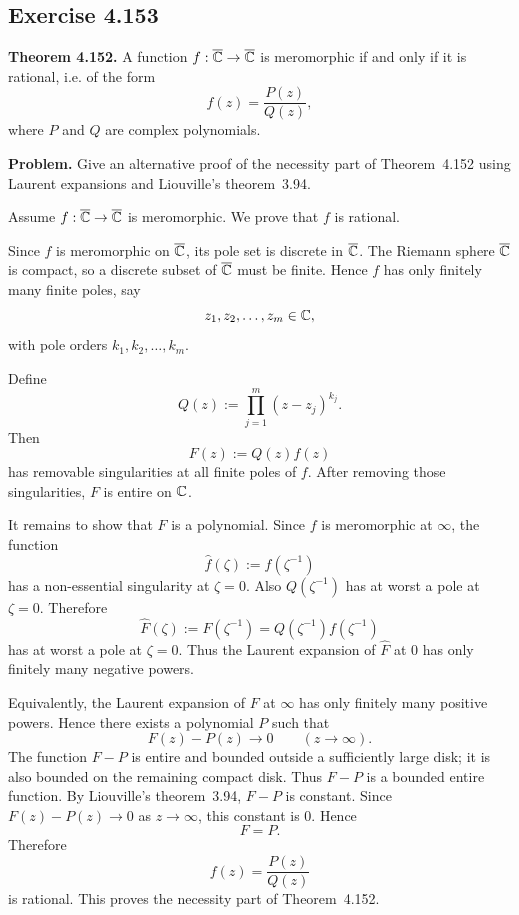 \documentclass{article}
\providecommand{\Chat}{\overline{\C}}
\begin{document}
\subsection{Exercise 4.153}
\label{sec:ca-ex-4-153-old}

\textbf{Theorem 4.152.}
A function $f:\Chat\to\Chat$ is meromorphic if and only if it is rational,
i.e. of the form
\[
  f(z)=\frac{P(z)}{Q(z)},
\]
where $P$ and $Q$ are complex polynomials.

\textbf{Problem.}
Give an alternative proof of the necessity part of Theorem~4.152 using
Laurent expansions and Liouville's theorem~3.94.

\begin{solution}
  Assume $f:\Chat\to\Chat$ is meromorphic. We prove that $f$ is rational.

  Since $f$ is meromorphic on $\Chat$, its pole set is discrete in $\Chat$.
  The Riemann sphere $\Chat$ is compact, so a discrete subset of $\Chat$ must be
  finite. Hence $f$ has only finitely many finite poles, say
  \[
    z_1,z_2,\dots,z_m\in\mathbb{C},
  \]
  with pole orders $k_1,k_2,\dots,k_m$.

  Define
  \[
    Q(z):=\prod_{j=1}^m (z-z_j)^{k_j}.
  \]
  Then
  \[
    F(z):=Q(z)f(z)
  \]
  has removable singularities at all finite poles of $f$. After removing those
  singularities, $F$ is entire on $\mathbb{C}$.

  It remains to show that $F$ is a polynomial. Since $f$ is meromorphic at
  $\infty$, the function
  \[
    \widehat f(\zeta):=f(\zeta^{-1})
  \]
  has a non-essential singularity at $\zeta=0$. Also $Q(\zeta^{-1})$ has at
  worst a pole at $\zeta=0$. Therefore
  \[
    \widehat F(\zeta):=F(\zeta^{-1})=Q(\zeta^{-1})f(\zeta^{-1})
  \]
  has at worst a pole at $\zeta=0$. Thus the Laurent expansion of
  $\widehat F$ at $0$ has only finitely many negative powers.

  Equivalently, the Laurent expansion of $F$ at $\infty$ has only finitely many
  positive powers. Hence there exists a polynomial $P$ such that
  \[
    F(z)-P(z)\to 0
    \qquad (z\to\infty).
  \]
  The function $F-P$ is entire and bounded outside a sufficiently large disk;
  it is also bounded on the remaining compact disk. Thus $F-P$ is a bounded
  entire function. By Liouville's theorem~3.94, $F-P$ is constant. Since
  $F(z)-P(z)\to0$ as $z\to\infty$, this constant is $0$. Hence
  \[
    F=P.
  \]
  Therefore
  \[
    f(z)=\frac{P(z)}{Q(z)}
  \]
  is rational. This proves the necessity part of Theorem~4.152.
\end{solution}
\end{document}
